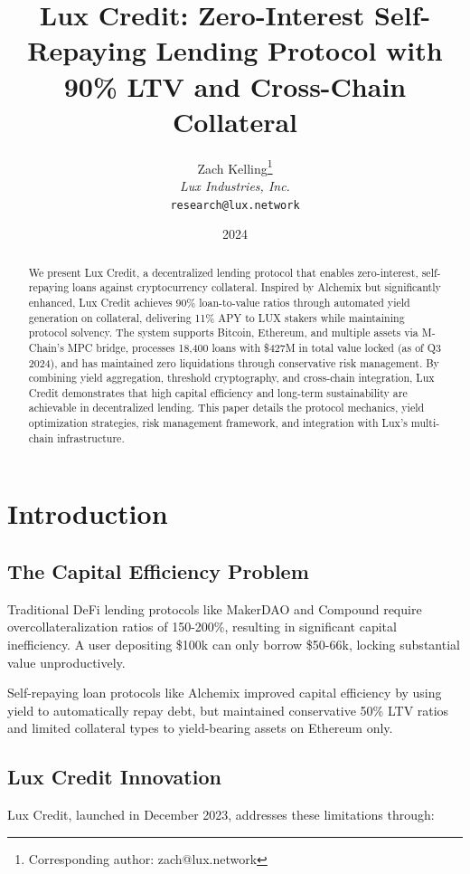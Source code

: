 \documentclass[11pt,a4paper]{article}
\title{Lux Credit: Zero-Interest Self-Repaying Lending Protocol with 90\% LTV and Cross-Chain Collateral}
\author{
Zach Kelling\thanks{Corresponding author: zach@lux.network}\\
\textit{Lux Industries, Inc.}\\
\texttt{research@lux.network}
}
\date{2024}
\begin{document}
\luxcoverpage
\begin{abstract}
We present Lux Credit, a decentralized lending protocol that enables zero-interest, self-repaying loans against cryptocurrency collateral. Inspired by Alchemix but significantly enhanced, Lux Credit achieves 90\% loan-to-value ratios through automated yield generation on collateral, delivering 11\% APY to LUX stakers while maintaining protocol solvency. The system supports Bitcoin, Ethereum, and multiple assets via M-Chain's MPC bridge, processes 18,400 loans with \$427M in total value locked (as of Q3 2024), and has maintained zero liquidations through conservative risk management. By combining yield aggregation, threshold cryptography, and cross-chain integration, Lux Credit demonstrates that high capital efficiency and long-term sustainability are achievable in decentralized lending. This paper details the protocol mechanics, yield optimization strategies, risk management framework, and integration with Lux's multi-chain infrastructure.
\end{abstract}



\section{Introduction}

\subsection{The Capital Efficiency Problem}

Traditional DeFi lending protocols like MakerDAO and Compound require overcollateralization ratios of 150-200\%, resulting in significant capital inefficiency. A user depositing \$100k can only borrow \$50-66k, locking substantial value unproductively.

Self-repaying loan protocols like Alchemix improved capital efficiency by using yield to automatically repay debt, but maintained conservative 50\% LTV ratios and limited collateral types to yield-bearing assets on Ethereum only.

\subsection{Lux Credit Innovation}

Lux Credit, launched in December 2023, addresses these limitations through:
\end{document}
